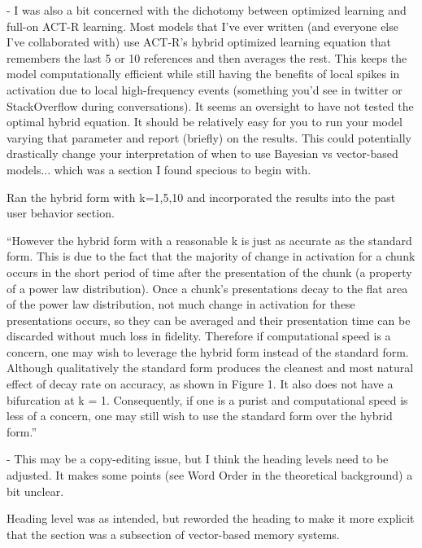 \documentclass[answers,12pt]{exam}
\begin{document}
\begin{questions}
\begin{solution}
\end{solution}

\question - I was also a bit concerned with the dichotomy between optimized learning and full-on ACT-R learning. Most models that I've ever written (and everyone else I've collaborated with) use ACT-R's hybrid optimized learning equation that remembers the last 5 or 10 references and then averages the rest. This keeps the model computationally efficient while still having the benefits of local spikes in activation due to local high-frequency events (something you'd see in twitter or StackOverflow during conversations). It seems an oversight to have not tested the optimal hybrid equation. It should be relatively easy for you to run your model varying that parameter and report (briefly) on the results. This could potentially drastically change your interpretation of when to use Bayesian vs vector-based models... which was a section I found specious to begin with.

\begin{solution}
Ran the hybrid form with k=1,5,10 and incorporated the results into the past user behavior section.

``However the hybrid form with a reasonable k is just as accurate as the standard form. This is due to the fact that the majority of change in activation for a chunk occurs in the short period of time after the presentation of the chunk (a property of a power law distribution). Once a chunk’s presentations decay to the flat area of the power law distribution, not much change in activation for these presentations occurs, so they can be averaged and their presentation time can be discarded without much loss in fidelity. Therefore if computational speed is a concern, one may wish to leverage the hybrid form instead of the standard form. Although qualitatively the standard form produces the cleanest and most natural effect of decay rate on accuracy, as shown in Figure 1. It also does not have a bifurcation at k = 1. Consequently, if one is a purist and computational speed is less of a concern, one may still wish to use the standard form over the hybrid form.''

\end{solution}

\question - This may be a copy-editing issue, but I think the heading levels need to be adjusted. It makes some points (see Word Order in the theoretical background) a bit unclear.

\begin{solution}
Heading level was as intended, but reworded the heading to make it more explicit that the section was a subsection of vector-based memory systems.
\end{solution}


\end{questions}
\end{document}
